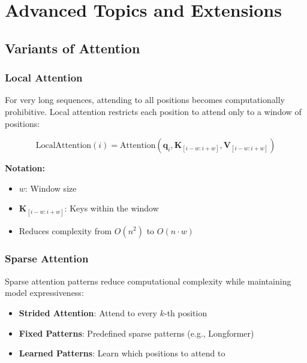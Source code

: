 
\section{Advanced Topics and Extensions}

\subsection{Variants of Attention}

\subsubsection{Local Attention}

For very long sequences, attending to all positions becomes computationally prohibitive. Local attention restricts each position to attend only to a window of positions:

\begin{equation}
\text{LocalAttention}(i) = \text{Attention}(\mathbf{q}_i, \mathbf{K}_{[i-w:i+w]}, \mathbf{V}_{[i-w:i+w]})
\end{equation}
\begin{notationbox}
\textbf{Notation:}
\begin{itemize}
    \item $w$: Window size
    \item $\mathbf{K}_{[i-w:i+w]}$: Keys within the window
    \item Reduces complexity from $O(n^2)$ to $O(n \cdot w)$
\end{itemize}
\end{notationbox}

\subsubsection{Sparse Attention}

Sparse attention patterns reduce computational complexity while maintaining model expressiveness:

\begin{itemize}
    \item \textbf{Strided Attention}: Attend to every $k$-th position
    \item \textbf{Fixed Patterns}: Predefined sparse patterns (e.g., Longformer)
    \item \textbf{Learned Patterns}: Learn which positions to attend to
\end{itemize}

